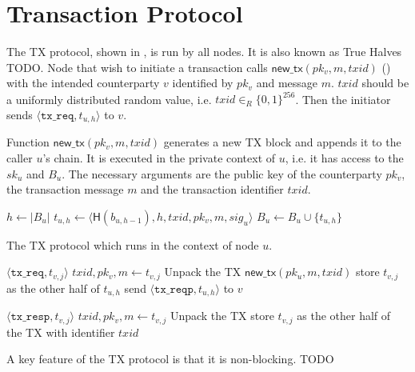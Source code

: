 \section{Transaction Protocol}
\label{sec:tx-protocol}

The TX protocol, shown in , is run by all nodes.
It is also known as True Halves TODO.
Node that wish to initiate a transaction calls $\textsf{new\_tx}(pk_v, m, txid)$ () with the intended counterparty $v$ identified by $pk_v$ and message $m$.
$txid$ should be a uniformly distributed random value, i.e. $txid \in_R \{0, 1\}^{256}$.
Then the initiator sends $\langle \texttt{tx\_req}, t_{u, h}\rangle$ to $v$.

\begin{algorithm}
    \caption{Function $\textsf{new\_tx}(pk_v, m, txid)$ generates a new TX block and appends it to the caller $u$'s chain.
    It is executed in the private context of $u$, i.e. it has access to the $sk_u$ and $B_u$.
    The necessary arguments are the public key of the counterparty $pk_v$, the transaction message $m$ and the transaction identifier $txid$.}
    \label{alg:new-tx}

    \begin{algorithmic}
    \State $h \gets |B_u|$
    \State $t_{u, h} \gets \langle \textsf{H}(b_{u, h - 1}), h, txid, pk_v, m, sig_u \rangle$
    \State $B_u \gets B_u \cup \{ t_{u, h} \}$
    \end{algorithmic}
\end{algorithm}

\begin{algorithm}
    \caption{The TX protocol which runs in the context of node $u$.}
    \label{alg:tx-proto}

    \begin{algorithmic}
        \Upon $\langle \texttt{tx\_req}, t_{v, j} \rangle$
        \State $txid, pk_v, m \gets t_{v, j}$ \Comment Unpack the TX
        \State $\textsf{new\_tx}(pk_u, m, txid)$
        \State store $t_{v, j}$ as the other half of $t_{u, h}$
        \State send $\langle \texttt{tx\_reqp}, t_{u, h} \rangle$ to $v$

        \Upon $\langle \texttt{tx\_resp}, t_{v, j} \rangle$
        \State $txid, pk_v, m \gets t_{v, j}$ \Comment Unpack the TX
        \State store $t_{v, j}$ as the other half of the TX with identifier $txid$
    \end{algorithmic}
\end{algorithm}

A key feature of the TX protocol is that it is non-blocking.
TODO

